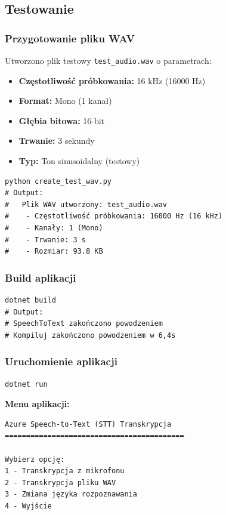 \documentclass[twoside]{article}
\begin{document}
\subsection{Testowanie}

\subsubsection{Przygotowanie pliku WAV}

Utworzono plik testowy \texttt{test\_audio.wav} o parametrach:
\begin{itemize}
	\item \textbf{Częstotliwość próbkowania:} 16 kHz (16000 Hz)
	\item \textbf{Format:} Mono (1 kanał)
	\item \textbf{Głębia bitowa:} 16-bit
	\item \textbf{Trwanie:} 3 sekundy
	\item \textbf{Typ:} Ton sinusoidalny (testowy)
\end{itemize}

\begin{verbatim}
python create_test_wav.py
# Output:
#   Plik WAV utworzony: test_audio.wav
#    - Częstotliwość próbkowania: 16000 Hz (16 kHz)
#    - Kanały: 1 (Mono)
#    - Trwanie: 3 s
#    - Rozmiar: 93.8 KB
\end{verbatim}

\subsubsection{Build aplikacji}

\begin{verbatim}
dotnet build
# Output:
# SpeechToText zakończono powodzeniem
# Kompiluj zakończono powodzeniem w 6,4s
\end{verbatim}

\subsubsection{Uruchomienie aplikacji}

\begin{verbatim}
dotnet run
\end{verbatim}

\textbf{Menu aplikacji:}
\begin{verbatim}
Azure Speech-to-Text (STT) Transkrypcja
==========================================

Wybierz opcję:
1 - Transkrypcja z mikrofonu
2 - Transkrypcja pliku WAV
3 - Zmiana języka rozpoznawania
4 - Wyjście
\end{verbatim}
\end{document}
